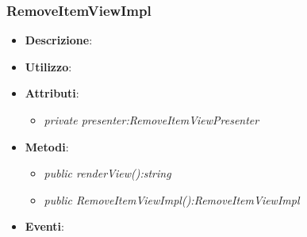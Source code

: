 \subsubsection{RemoveItemViewImpl}
\begin{itemize}
\item \textbf{Descrizione}: 
\item \textbf{Utilizzo}:
\item \textbf{Attributi}: 
	\begin{itemize}
	\item \textit{private presenter:RemoveItemViewPresenter}\\
	
	\end{itemize}
\item \textbf{Metodi}:
	\begin{itemize}
	\item \textit{public renderView():string}\\
	
	\item \textit{public RemoveItemViewImpl():RemoveItemViewImpl}\\
	
	\end{itemize}
\item \textbf{Eventi}:
\end{itemize}


